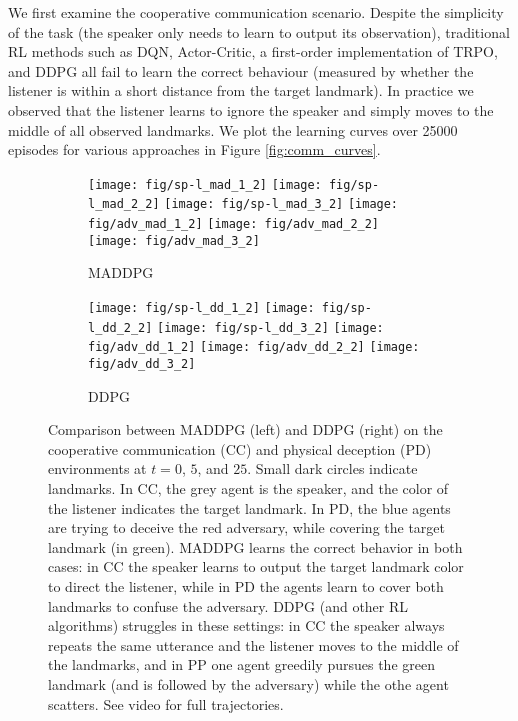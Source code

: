 \documentclass{article}
\begin{document}
We first examine the cooperative communication scenario. Despite the simplicity of the task (the speaker only needs to learn to output its observation), traditional RL methods such as DQN, Actor-Critic, a first-order implementation of TRPO, and DDPG all fail to learn the correct behaviour (measured by whether the listener is within a short distance from the target landmark). In practice we observed that the listener learns to ignore the speaker and simply moves to the middle of all observed landmarks. We plot the learning curves over 25000 episodes for various approaches in Figure \ref{fig:comm_curves}.



\begin{figure}
\begin{subfigure}{.50\textwidth}
  \centering
  \texttt{[image: fig/sp-l\_mad\_1\_2]}
  \texttt{[image: fig/sp-l\_mad\_2\_2]}
  \texttt{[image: fig/sp-l\_mad\_3\_2]}
  \texttt{[image: fig/adv\_mad\_1\_2]}
  \texttt{[image: fig/adv\_mad\_2\_2]}
  \texttt{[image: fig/adv\_mad\_3\_2]}
  \caption{MADDPG}
\end{subfigure}
\hspace{1mm}
\begin{subfigure}{.50\textwidth}
  \centering
  \texttt{[image: fig/sp-l\_dd\_1\_2]}
  \texttt{[image: fig/sp-l\_dd\_2\_2]}
  \texttt{[image: fig/sp-l\_dd\_3\_2]}
  \texttt{[image: fig/adv\_dd\_1\_2]}
  \texttt{[image: fig/adv\_dd\_2\_2]}
  \texttt{[image: fig/adv\_dd\_3\_2]}
  \caption{DDPG}
\end{subfigure}
\vspace{-2mm}
\caption{Comparison between MADDPG (left) and DDPG (right) on the cooperative communication (CC) and physical deception (PD) environments at $t=0$, $5$, and $25$. Small dark circles indicate landmarks. In CC, the grey agent is the speaker, and the color of the listener indicates the target landmark. In PD, the blue agents are trying to deceive the red adversary, while covering the target landmark (in green). MADDPG learns the correct behavior in both cases: in CC the speaker learns to output the target landmark color to direct the listener, while in PD the agents learn to cover both landmarks to confuse the adversary. DDPG (and other RL algorithms) struggles in these settings: in CC the speaker always repeats the same utterance and the listener moves to the middle of the landmarks, and in PP one agent greedily pursues the green landmark (and is followed by the adversary) while the othe agent scatters. See video for full trajectories. \vspace{-4mm}}\label{fig:disp}
\end{figure}
\end{document}
